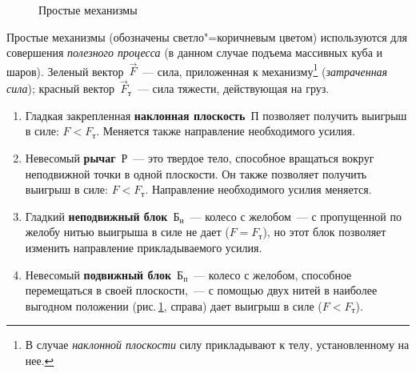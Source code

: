 \documentclass[main.tex]{subfiles}
\begin{document}
\begin{figure}[H]
\caption{Простые механизмы}
\label{fig:p56}
\end{figure}

Простые механизмы (обозначены светло"=коричневым цветом) используются для совершения \emph{полезного процесса} (в данном случае подъема массивных куба и шаров). Зеленый вектор~$\vec F$~--- сила, приложенная к механизму\footnote{В случае \emph{наклонной плоскости} силу прикладывают к телу, установленному на нее.} (\emph{затраченная сила}); красный вектор~$\vec F_\text{т}$~--- сила тяжести, действующая на груз. 
\begin{enumerate}
    \item Гладкая закрепленная \textbf{наклонная плоскость}~П позволяет получить выигрыш в силе: $F<F_\text{т}$. Меняется также направление необходимого усилия.
    \item Невесомый \textbf{рычаг}~Р~--- это твердое тело, способное вращаться вокруг неподвижной точки в одной плоскости. Он также позволяет получить выигрыш в силе: $F<F_\text{т}$. Направление необходимого усилия меняется.
    \item Гладкий \textbf{неподвижный блок}~Б$_\text{н}$~--- колесо с желобом~--- с пропущенной по желобу нитью выигрыша в силе не дает ($F=F_\text{т}$), но этот блок позволяет изменить направление прикладываемого усилия.
    \item Невесомый \textbf{подвижный блок}~Б$_\text{п}$~--- колесо с желобом, способное перемещаться в своей плоскости,~--- с помощью двух нитей в наиболее выгодном положении (рис.\,\ref{fig:p56}, справа) дает выигрыш в силе ($F<F_\text{т}$).
    
\end{enumerate}















 
\end{document}
